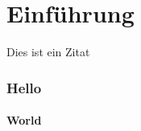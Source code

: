 \chapter{Einführung}

\epigraph{Dies ist ein Zitat}{\thesisAuthor}

\Blindtext[1]



\Blindtext[1]



\Blindtext[1]

\subsection{Hello}

\Blindtext[1]

\subsubsection{World}

\Blindtext[1]